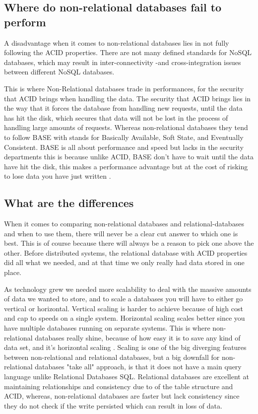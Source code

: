 \subsection{Where do non-relational databases fail to perform}
A disadvantage when it comes to non-relational databases lies in not fully following the ACID properties. There are not many defined standards for NoSQL databases, which may result in inter-connectivity -and cross-integration issues between different NoSQL databases. \parencite{loginradius-rdbms-vs-nosql}

This is where Non-Relational databases trade in performances, for the security that ACID brings when handling the data. The security that ACID brings lies in the way that it forces the database from handling new requests, until the data has hit the disk, which secures that data will not be lost in the process of handling large amounts of requests.
Whereas non-relational databases they tend to follow BASE with stands for Basically Available, Soft State, and Eventually Consistent. 
BASE is all about performance and speed but lacks in the security departments this is because unlike ACID, BASE don’t have to wait until the data have hit the disk, this makes a performance advantage but at the cost of risking to lose data you have just written  \parencite{neo4j-acid-vs-base} \parencite{dataversity-acid-vs-base}.

\subsection{What are the differences}
When it comes to comparing non-relational databases and relational-databases and when to use them, there will never be a clear cut answer to which one is best. This is of course because there will always be a reason to pick one above the other.
Before distributed systems, the relational database with ACID properties did all what we needed, and at that time we only really had data stored in one place.

As technology grew we needed more scalability to deal with the massive amounts of data we wanted to store, and to scale a databases you will have to either go vertical or horizontal.
Vertical scaling is harder to achieve because of high cost and cap to speeds on a single system. Horizontal scaling scales better since you have multiple databases running on separate systems. This is where non-relational databases really shine, because of how easy it is to save any kind of data set, and it’s horizontal scaling \parencite{investopedia-horizontal-vs-vertical-scaling}.
Scaling is one of the big diverging features between non-relational and relational databases, but a big downfall for non-relational databases "take all" approach, is that it does not have a main query language unlike Relational Databases SQL. 
Relational databases are excellent at maintaining relationships and consistency due to of the table structure and ACID, whereas, non-relational databases are faster but lack consistency since they do not check if the write persisted which can result in loss of data.
